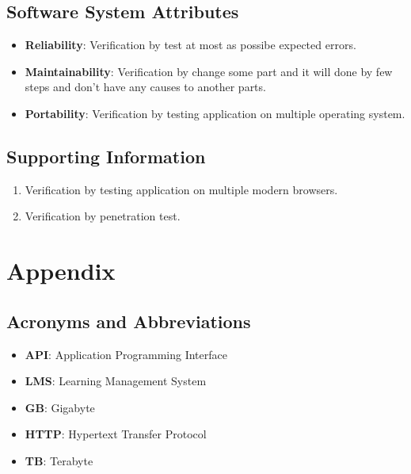 \documentclass[ 10pt]{report}
\begin{document}
        \section{Software System Attributes}
        \begin{itemize}
            \item \textbf{Reliability}: Verification by test at most as possibe expected errors.
            \item \textbf{Maintainability}: Verification by change some part and it will done by few steps and don't have any causes to another parts.
            \item \textbf{Portability}: Verification by testing application on multiple operating system.
        \end{itemize}
        \section{Supporting Information}
        \begin{enumerate}
            \item Verification by testing application on multiple modern browsers.
            \item Verification by penetration test.
        \end{enumerate}
    \pagebreak


    \chapter{Appendix}
        \section{Acronyms and Abbreviations}
        \begin{itemize}
            \item \textbf{API}: Application Programming Interface
            \item \textbf{LMS}: Learning Management System
            \item \textbf{GB}: Gigabyte
            \item \textbf{HTTP}: Hypertext Transfer Protocol
            \item \textbf{TB}: Terabyte
        \end{itemize}

\end{document}
